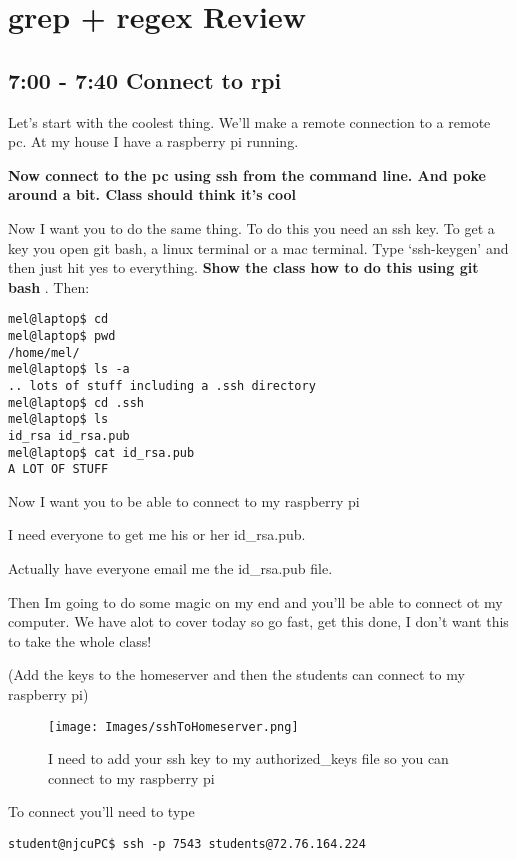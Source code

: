 \documentclass[10pt]{article}
\begin{document}
\section{grep + regex Review}

\subsection{7:00 - 7:40 Connect to rpi}
Let's start with the coolest thing. We'll make a remote connection to a remote
pc. At my house I have a raspberry pi running. 



{\LARGE \textbf{Now connect to the pc using ssh from the command line. And poke
around a bit. Class should think it's cool}}

Now I want you to do the same thing. To do this you need an ssh key. To get a
key you open git bash, a linux terminal or a mac terminal. Type `ssh-keygen' and
then just hit yes to everything. \textbf{Show the class how to do this using git
bash }. Then:

\begin{lstlisting}[style=term]
mel@laptop$ cd 
mel@laptop$ pwd
/home/mel/
mel@laptop$ ls -a
.. lots of stuff including a .ssh directory
mel@laptop$ cd .ssh
mel@laptop$ ls 
id_rsa id_rsa.pub
mel@laptop$ cat id_rsa.pub
A LOT OF STUFF
\end{lstlisting}

Now I want you to be able to connect to my raspberry pi

I need everyone to get me his or her id\_rsa.pub.

Actually have everyone email me the id\_rsa.pub file.


Then Im going to do some magic on my end and you'll be able to connect ot my
computer. We have alot to cover today so go fast, get this done, I don't want
this to take the whole class!

(Add the keys to the homeserver and then the students can connect to my
raspberry pi)

\begin{figure}[h]
\centering
	\texttt{[image: Images/sshToHomeserver.png]}
	\caption{I need to add your ssh key to my authorized\_keys file so you can
connect to my raspberry pi}
	\label{fig:firstssh}
\end{figure}


To connect you'll need to type

\begin{lstlisting}[style=term]
student@njcuPC$ ssh -p 7543 students@72.76.164.224
\end{lstlisting}
\end{document}
